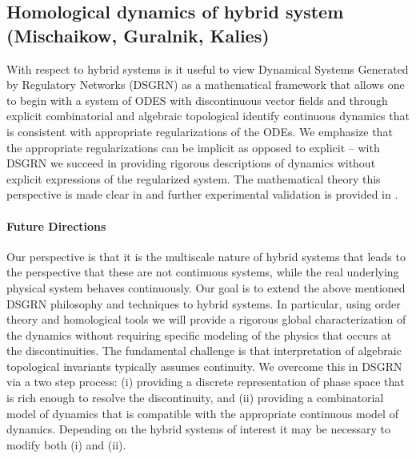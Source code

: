 \documentclass[letterpaper,11pt]{article}
\begin{document}
\subsection{Homological dynamics of hybrid system (Mischaikow, Guralnik, Kalies)}
\label{sec:homologicaldynamicsHS}
With respect to hybrid systems is it useful to view
Dynamical Systems Generated by Regulatory Networks (DSGRN) as a mathematical framework that allows one to begin with a system of ODES with discontinuous vector fields and through explicit combinatorial and algebraic topological identify continuous dynamics that is consistent with  appropriate  regularizations of the ODEs.
We emphasize that the appropriate regularizations can be implicit as opposed to explicit -- with DSGRN we succeed in providing rigorous descriptions of dynamics without explicit expressions of the regularized system.
The mathematical theory this perspective is made clear in \cite{gameiro2024globaldynamicsordinarydifferential} and further experimental validation is provided in \cite{kepley2024globalanalysisregulatorynetwork}.

\paragraph*{Future Directions}
Our perspective is that it is the multiscale nature of hybrid systems that leads to the perspective that these are not continuous systems, while the real underlying physical system behaves continuously.
Our goal is to extend the above mentioned DSGRN philosophy and techniques to hybrid systems. 
In particular, using order theory and homological tools we will provide a rigorous global characterization of the dynamics without requiring specific modeling of the physics that occurs at the discontinuities.
The fundamental challenge is that interpretation of algebraic topological invariants typically assumes continuity.
We overcome this in DSGRN via a two step process: (i) providing a discrete representation of phase space that is rich enough to resolve the discontinuity, and (ii) providing a combinatorial model of dynamics that is compatible with the appropriate continuous model of dynamics.
Depending on the hybrid  systems of interest it may be necessary to modify both (i) and (ii).
%
\end{document}
